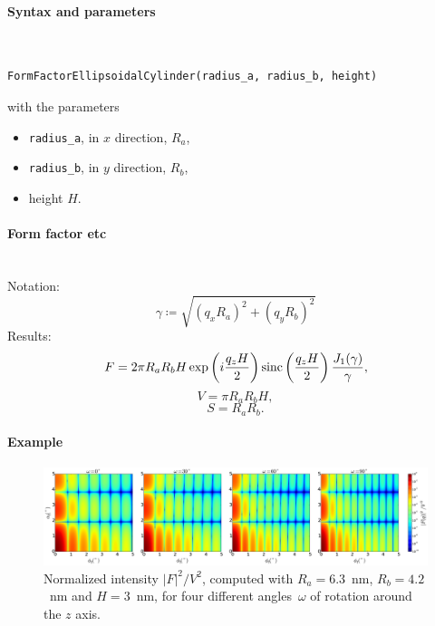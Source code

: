 \paragraph{Syntax and parameters}\strut\\[-2ex plus .2ex minus .2ex]
\begin{lstlisting}[language=python, style=eclipseboxed,numbers=none,nolol]
  FormFactorEllipsoidalCylinder(radius_a, radius_b, height)
\end{lstlisting}
with the parameters
\begin{itemize}
\item \texttt{radius\_a}, in $x$ direction, $R_a$,
\item \texttt{radius\_b}, in $y$ direction, $R_b$,
\item height $H$.
\end{itemize}


\paragraph{Form factor etc}\strut\\
Notation:
\begin{equation*}
  \gamma \coloneqq \sqrt{(q_x R_a)^2+(q_y R_b)^2}  
\end{equation*}
Results:
\begin{equation*}
F = 2\pi R_a R_b H \exp\left(i\frac{q_z H}{2}\right)
   \operatorname{sinc}\left(\frac{q_z H}{2}\right) \frac{J_1(\gamma)}{\gamma},
\end{equation*}
\begin{equation*}
  V = \pi R_a R_bH,
\end{equation*}
\begin{equation*}
  S = R_a R_b.
\end{equation*}

\paragraph{Example}\strut

\begin{figure}[H]
\begin{center}
\includegraphics[width=\textwidth]{fig/ff2/ff_EllipsoidalCylinder.pdf}
\end{center}
\caption{Normalized intensity $|F|^2/V^2$,
computed with $R_a=6.3$~nm, $R_b=4.2$~nm and $H=3$~nm,
for four different angles~$\omega$ of rotation around the $z$ axis.}
\end{figure}


